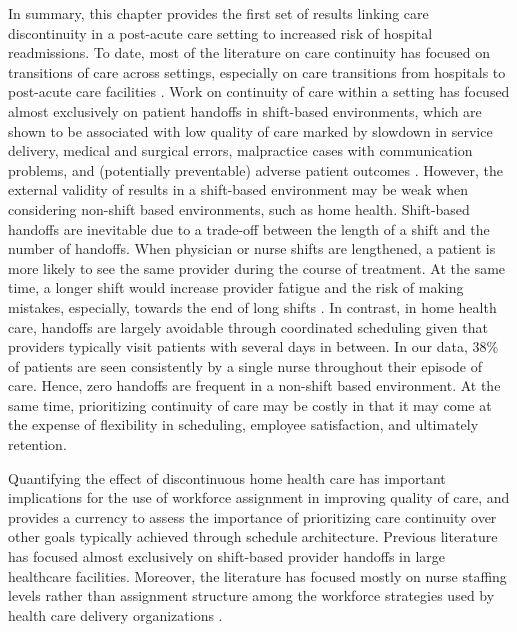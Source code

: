 \documentclass[final,12pt, notitlepage]{article}
\begin{document}
In summary, this chapter provides the first set of results linking care discontinuity in a post-acute care setting to increased risk of hospital readmissions.
To date, most of the literature on care continuity has focused on transitions of care across settings, especially on care transitions from hospitals to post-acute care facilities \citep{Naylor1999}.
Work on continuity of care within a setting has focused almost exclusively on patient handoffs in shift-based environments, which are shown to be associated with low quality of care marked by slowdown in service delivery, medical and surgical errors, malpractice cases with communication problems, and (potentially preventable) adverse patient outcomes \citep{Laine1993, Petersen1994, Riesenberg2009}.
However, the external validity of results in a shift-based environment may be weak when considering non-shift based environments, such as home health.  Shift-based handoffs are inevitable due to a trade-off between the length of a shift and the number of handoffs. When physician or nurse shifts are lengthened, a patient is more likely to see the same provider during the course of treatment. At the same time, a longer shift would increase provider fatigue and the risk of making mistakes, especially, towards the end of long shifts \citep{Brachet2012}. In contrast, in home health care, handoffs are largely avoidable through coordinated scheduling given that providers typically visit patients with several days in between. In our data, 38\% of patients are seen consistently by a single nurse throughout their episode of care. Hence, zero handoffs are frequent in a non-shift based environment.  At the same time, prioritizing continuity of care may be costly in that it may come at the expense of flexibility in scheduling, employee satisfaction, and ultimately retention. 


Quantifying the effect of discontinuous home health care has important implications for the use of workforce assignment in improving quality of care, and provides a currency to assess the importance of prioritizing care continuity over other goals typically achieved through schedule architecture. Previous literature has focused almost exclusively on shift-based provider handoffs in large healthcare facilities. Moreover, the literature has focused mostly on nurse staffing levels rather than assignment structure among the workforce strategies used by health care delivery organizations \citep{Aiken2002, Bae2010, Needleman2011, Cook2012, Lin2014, Lu2016, Hockenberry2016}.
\end{document}
